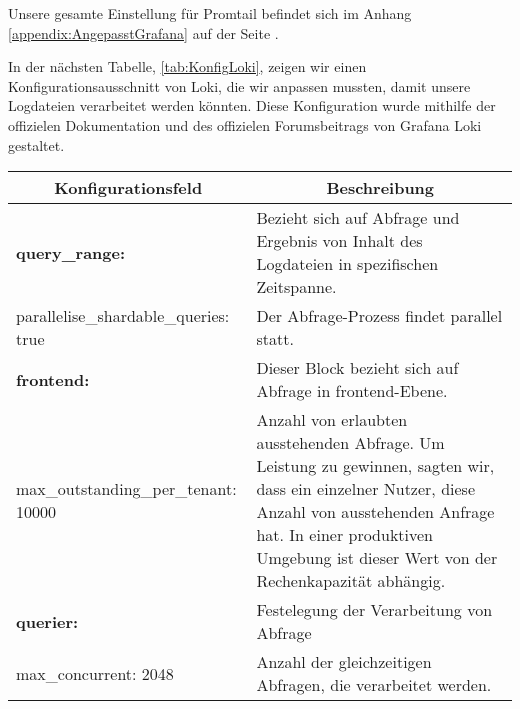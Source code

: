 Unsere gesamte Einstellung für Promtail befindet sich im Anhang \ref{appendix:AngepasstGrafana} auf der Seite \pageref{appendix:AngepasstGrafana}.

In der nächsten Tabelle, \ref{tab:KonfigLoki}, zeigen wir einen Konfigurationsausschnitt von Loki, die wir anpassen mussten, damit unsere Logdateien verarbeitet werden könnten. Diese Konfiguration wurde mithilfe der offizielen Dokumentation \citep{Grafana_ConfigLoki} und des offizielen Forumsbeitrags von Grafana Loki \citep{githubforum} gestaltet.

\begin{table}[H]
  \begin{tabularx}{\textwidth}{|m{6cm}|X|}
  \hline
  \multicolumn{1}{|c|}{\textbf{Konfigurationsfeld}} & \multicolumn{1}{|c|}{\textbf{Beschreibung}} \\
  \hline
  \textbf{query\_range:} & Bezieht sich auf Abfrage und Ergebnis von Inhalt des Logdateien in spezifischen Zeitspanne. \\
  \hphantom{te}parallelise\_shardable\_queries: true & Der Abfrage-Prozess findet parallel statt.\\ \hline

  \textbf{frontend:} & Dieser Block bezieht sich auf Abfrage in \gls{frontend}-Ebene. \\
  \hphantom{te}max\_outstanding\_per\_tenant: 10000 & Anzahl von erlaubten  ausstehenden Abfrage. Um Leistung zu gewinnen, sagten wir, dass ein einzelner Nutzer, diese Anzahl von ausstehenden Anfrage hat. In einer produktiven Umgebung ist dieser Wert von der Rechenkapazität abhängig.\\ \hline

  \textbf{querier:} & Festelegung der Verarbeitung von Abfrage \\ 
  \hphantom{te}max\_concurrent: 2048 & Anzahl der gleichzeitigen Abfragen, die verarbeitet werden. \\ \hline

  \end{tabularx}
\end{table}

